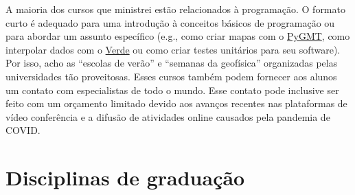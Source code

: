 \documentclass[12pt,a4paper,oneside]{book}
\begin{document}
A maioria dos cursos que ministrei estão relacionados à programação. O formato
curto é adequado para uma introdução à conceitos básicos de programação ou
para abordar um assunto específico (e.g., como criar mapas com o
\href{https://www.pygmt.org}{PyGMT},
como interpolar dados com o \href{https://www.fatiando.org/verde}{Verde}
ou como criar testes unitários para seu software).
Por isso, acho as ``escolas de verão'' e ``semanas da geofísica'' organizadas
pelas universidades tão proveitosas.
Esses cursos também podem fornecer aos alunos um contato com especialistas de
todo o mundo.
Esse contato pode inclusive ser feito com um orçamento limitado
devido aos avanços recentes nas plataformas de vídeo conferência e a difusão de
atividades online causados pela pandemia de COVID.


\section{Disciplinas de graduação}
\label{sec_ensino_grad}
\end{document}
